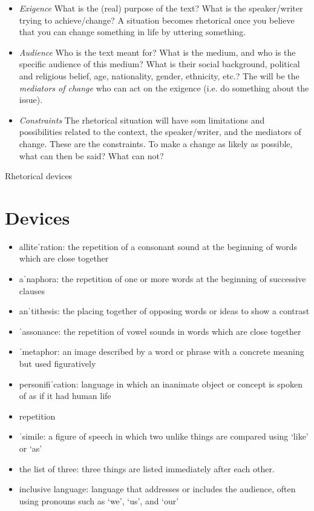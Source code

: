 \documentclass[11pt,a4paper,oneside]{book}
\begin{document}
\begin{itemize}
\item \emph{Exigence} What is the (real) purpose of the text? What is the speaker/writer trying to achieve/change? A situation becomes rhetorical once you believe that you can change something in life by uttering something.
\item \emph{Audience} Who is the text meant for? What is the medium, and who is the specific audience of this medium? What is their social background, political and religious belief, age, nationality, gender, ethnicity, etc.? The will be the \emph{mediators of change} who can act on the exigence (i.e. do something about the issue).
\item \emph{Constraints} The rhetorical situation will have som limitations and possibilities related to the context, the speaker/writer, and the mediators of change. These are the constraints. To make a change as likely as possible, what can then be said? What can not?
\end{itemize}

\clearpage{}\label{note-rhetorical-devices}
{\displayfont\color{navy}\fontsize{30}{34}\selectfont Rhetorical devices\par}\vspace{4mm}

\section*{Devices}

\begin{itemize}
\item alliteˈration: the repetition of a consonant sound at the beginning of words which are close together
\item aˈnaphora: the repetition of one or more words at the beginning of successive clauses
\item anˈtithesis: the placing together of opposing words or ideas to show a contrast
\item ˈassonance: the repetition of vowel sounds in words which are close together
\item ˈmetaphor: an image described by a word or phrase with a concrete meaning but used figuratively
\item personifiˈcation: language in which an inanimate object or concept is spoken of as if it had human life
\item repetition
\item ˈsimile: a figure of speech in which two unlike things are compared using ‘like’ or ‘as’
\item the list of three: three things are listed immediately after each other.
\item inclusive language: language that addresses or includes the audience, often using pronouns such as ‘we’, ‘us’, and ‘our’
\end{itemize}
\end{document}
